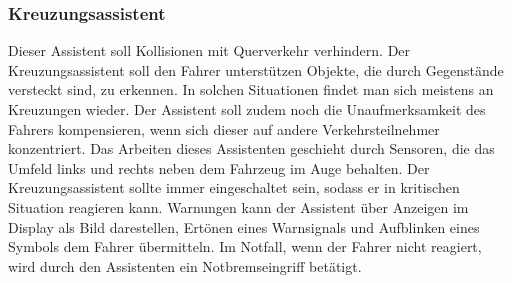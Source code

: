         \subsubsection{Kreuzungsassistent}
        Dieser Assistent soll Kollisionen mit Querverkehr verhindern. Der Kreuzungsassistent soll den Fahrer 
        unterstützen Objekte, die durch Gegenstände versteckt sind, zu erkennen. In solchen Situationen findet 
        man sich meistens an Kreuzungen wieder. Der Assistent soll zudem noch die Unaufmerksamkeit des 
        Fahrers kompensieren, wenn sich dieser auf andere Verkehrsteilnehmer konzentriert. Das Arbeiten  
        dieses Assistenten geschieht durch Sensoren, die das Umfeld links und rechts neben dem Fahrzeug im 
        Auge behalten. Der Kreuzungsassistent sollte immer eingeschaltet sein, sodass er in kritischen Situation 
        reagieren kann. Warnungen kann der Assistent über Anzeigen im Display als Bild darestellen, Ertönen eines Warnsignals
        und Aufblinken eines Symbols dem Fahrer übermitteln. Im Notfall, wenn der Fahrer nicht 
        reagiert, wird durch den Assistenten ein Notbremseingriff betätigt.
        \cite{kreuzungsassi.PB1} \cite{kreuzungsassi.PB2}
